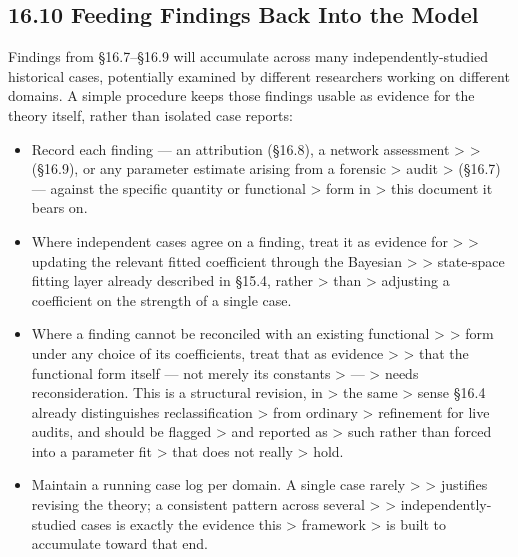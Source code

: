 \documentclass[
]{article}
\begin{document}
\hypertarget{feeding-findings-back-into-the-model}{%
\subsection{16.10 Feeding Findings Back Into the
Model}\label{feeding-findings-back-into-the-model}}

Findings from §16.7--§16.9 will accumulate across many
independently-studied historical cases, potentially examined by
different researchers working on different domains. A simple procedure
keeps those findings usable as evidence for the theory itself, rather
than isolated case reports:

\begin{itemize}
\item
  Record each finding --- an attribution (§16.8), a network assessment
  \textgreater{} \textgreater{} (§16.9), or any parameter estimate
  arising from a forensic \textgreater{} audit \textgreater{} (§16.7)
  --- against the specific quantity or functional \textgreater{} form in
  \textgreater{} this document it bears on.
\item
  Where independent cases agree on a finding, treat it as evidence for
  \textgreater{} \textgreater{} updating the relevant fitted coefficient
  through the Bayesian \textgreater{} \textgreater{} state-space fitting
  layer already described in §15.4, rather \textgreater{} than
  \textgreater{} adjusting a coefficient on the strength of a single
  case.
\item
  Where a finding cannot be reconciled with an existing functional
  \textgreater{} \textgreater{} form under any choice of its
  coefficients, treat that as evidence \textgreater{} \textgreater{}
  that the functional form itself --- not merely its constants
  \textgreater{} --- \textgreater{} needs reconsideration. This is a
  structural revision, in \textgreater{} the same \textgreater{} sense
  §16.4 already distinguishes reclassification \textgreater{} from
  ordinary \textgreater{} refinement for live audits, and should be
  flagged \textgreater{} and reported as \textgreater{} such rather than
  forced into a parameter fit \textgreater{} that does not really
  \textgreater{} hold.
\item
  Maintain a running case log per domain. A single case rarely
  \textgreater{} \textgreater{} justifies revising the theory; a
  consistent pattern across several \textgreater{} \textgreater{}
  independently-studied cases is exactly the evidence this
  \textgreater{} framework \textgreater{} is built to accumulate toward
  that end.
\end{itemize}
\end{document}
